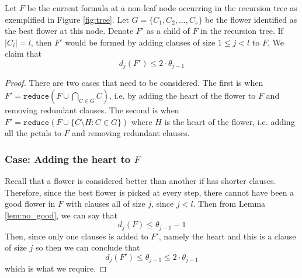 \begin{lemma} \label{lem:rem_sparse}
    Let $F$ be the current formula at a non-leaf node occurring in the recursion tree
    as exemplified in Figure \ref{fig:tree}. Let $G = \{C_1, C_2, \dots, C_s\}$ be the flower
    identified as the best flower at this node. Denote $F'$ as a child of $F$ in the recursion
    tree. If $|C_i| = l$, then $F'$ would be formed by adding clauses of size $1 \leq j < l$ to $F$.
    We claim that
    \begin{equation}
        d_j(F') \leq 2 \cdot \theta_{j-1}
    \end{equation}
\end{lemma}
\begin{proof}
    There are two cases that need to be considered. The first is when 
    $F' = \texttt{reduce}(F \cup \bigcap_{C \in G} C)$, i.e. by adding the heart of
    the flower to $F$ and removing redundant clauses. The second is when
    $F' = \texttt{reduce}(F \cup \{C \setminus H : C \in G\})$ where $H$ is the heart of the flower,
    i.e. adding all the petals to $F$ and removing redundant clauses.
    \subsubsection{Case: Adding the heart to $F$}
    Recall that a flower is considered better than another if has shorter clauses. Therefore, since
    the best flower is picked at every step, there cannot have been a good flower in $F$ with
    clauses all of size $j$, since $j < l$. Then from Lemma \ref{lem:no_good}, we can say that
    \begin{equation}
        d_j(F) \leq \theta_{j-1} - 1
    \end{equation}
    Then, since only one clauses is added to $F'$, namely the heart and
    this is a clause of size $j$ so then we can conclude that
    \begin{equation}
        d_j(F') \leq \theta_{j-1} \leq 2 \cdot \theta_{j - 1}
    \end{equation}
    which is what we require.

\end{proof}
